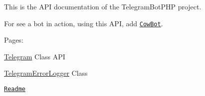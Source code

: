 This is the A\-P\-I documentation of the Telegram\-Bot\-P\-H\-P project.\par
 For see a bot in action, using this A\-P\-I, add \href{https://telegram.me/cowmooobot}{\tt Cow\-Bot}.\par
 Pages\-:\par
 \hyperlink{class_telegram}{Telegram} Class A\-P\-I \par
 \hyperlink{class_telegram_error_logger}{Telegram\-Error\-Logger} Class\par
 \href{md__home_travis_build__eleirbag89__telegram_bot_p_h_p__r_e_a_d_m_e.html}{\tt Readme} 